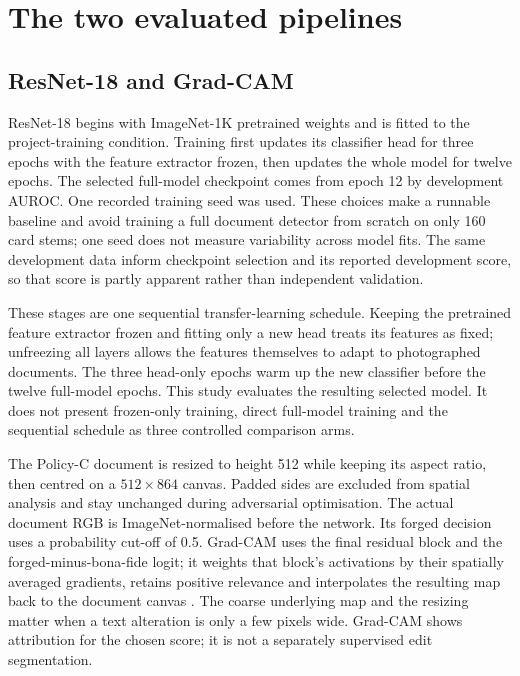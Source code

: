 \section{The two evaluated pipelines}
\label{sec:method-pipelines}

\subsection{ResNet-18 and Grad-CAM}

ResNet-18 begins with ImageNet-1K pretrained weights and is fitted to the project-training condition. Training first updates its classifier head for three epochs with the feature extractor frozen, then updates the whole model for twelve epochs. The selected full-model checkpoint comes from epoch 12 by development AUROC. One recorded training seed was used. These choices make a runnable baseline and avoid training a full document detector from scratch on only 160 card stems; one seed does not measure variability across model fits. The same development data inform checkpoint selection and its reported development score, so that score is partly apparent rather than independent validation.

These stages are one sequential transfer-learning schedule. Keeping the pretrained feature extractor frozen and fitting only a new head treats its features as fixed; unfreezing all layers allows the features themselves to adapt to photographed documents. The three head-only epochs warm up the new classifier before the twelve full-model epochs. This study evaluates the resulting selected model. It does not present frozen-only training, direct full-model training and the sequential schedule as three controlled comparison arms.

The Policy-C document is resized to height 512 while keeping its aspect ratio, then centred on a $512\times864$ canvas. Padded sides are excluded from spatial analysis and stay unchanged during adversarial optimisation. The actual document RGB is ImageNet-normalised before the network. Its forged decision uses a probability cut-off of 0.5. Grad-CAM uses the final residual block and the forged-minus-bona-fide logit; it weights that block's activations by their spatially averaged gradients, retains positive relevance and interpolates the resulting map back to the document canvas \citep{selvaraju2017gradcam}. The coarse underlying map and the resizing matter when a text alteration is only a few pixels wide. Grad-CAM shows attribution for the chosen score; it is not a separately supervised edit segmentation.

